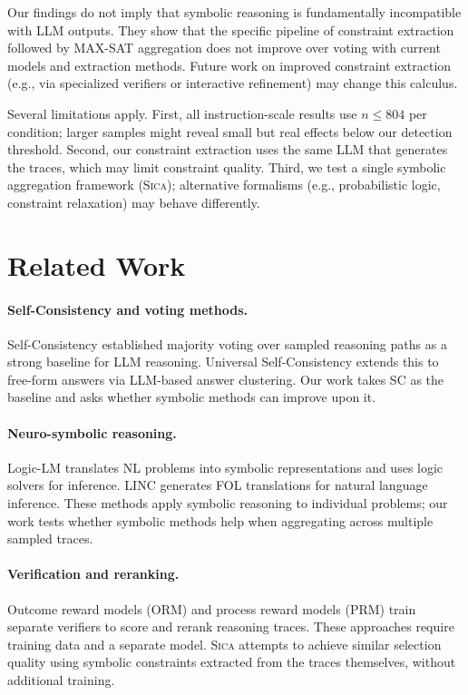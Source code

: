 \documentclass[11pt,a4paper]{article}
\newcommand{\sica}{\textsc{Sica}}
\begin{document}
Our findings do not imply that symbolic reasoning is fundamentally incompatible with LLM outputs. They show that the specific pipeline of constraint extraction followed by MAX-SAT aggregation does not improve over voting with current models and extraction methods. Future work on improved constraint extraction (e.g., via specialized verifiers or interactive refinement) may change this calculus.

Several limitations apply. First, all instruction-scale results use $n \leq 804$ per condition; larger samples might reveal small but real effects below our detection threshold. Second, our constraint extraction uses the same LLM that generates the traces, which may limit constraint quality. Third, we test a single symbolic aggregation framework (\sica{}); alternative formalisms (e.g., probabilistic logic, constraint relaxation) may behave differently.

\section{Related Work}

\paragraph{Self-Consistency and voting methods.}
Self-Consistency \citep{wang2023selfconsistency} established majority voting over sampled reasoning paths as a strong baseline for LLM reasoning. Universal Self-Consistency \citep{chen2023universal} extends this to free-form answers via LLM-based answer clustering. Our work takes SC as the baseline and asks whether symbolic methods can improve upon it.

\paragraph{Neuro-symbolic reasoning.}
Logic-LM \citep{pan2023logiclm} translates NL problems into symbolic representations and uses logic solvers for inference. LINC \citep{olausson2023linc} generates FOL translations for natural language inference. These methods apply symbolic reasoning to individual problems; our work tests whether symbolic methods help when aggregating across multiple sampled traces.

\paragraph{Verification and reranking.}
Outcome reward models (ORM) and process reward models (PRM) \citep{cobbe2021training, lightman2023lets} train separate verifiers to score and rerank reasoning traces. These approaches require training data and a separate model. \sica{} attempts to achieve similar selection quality using symbolic constraints extracted from the traces themselves, without additional training.
\end{document}
